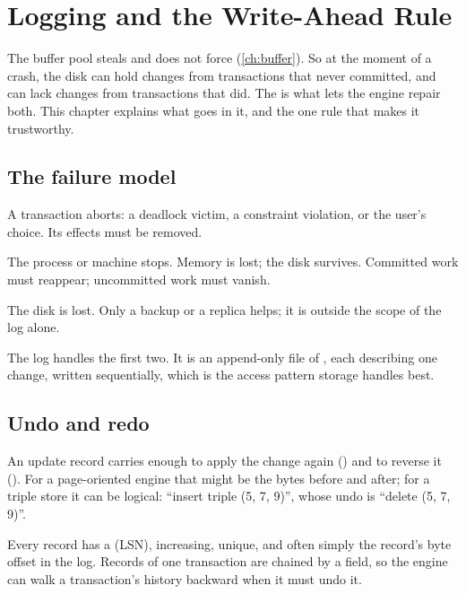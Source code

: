 \chapter{Logging and the Write-Ahead Rule}
\label{ch:wal}

The buffer pool steals and does not force (\cref{ch:buffer}). So at the moment of
a crash, the disk can hold changes from transactions that never committed, and
can lack changes from transactions that did. The  is what lets the
engine repair both. This chapter explains what goes in it, and the one rule that
makes it trustworthy.

\section{The failure model}

\begin{description}[leftmargin=1.2em]
\item[Transaction failure.] A transaction aborts: a deadlock victim, a constraint violation, or the user's choice. Its effects must be removed.
\item[System failure.] The process or machine stops. Memory is lost; the disk survives. Committed work must reappear; uncommitted work must vanish.
\item[Media failure.] The disk is lost. Only a backup or a replica helps; it is outside the scope of the log alone.
\end{description}

The log handles the first two. It is an append-only file of ,
each describing one change, written sequentially, which is the access pattern
storage handles best.

\section{Undo and redo}

An update record carries enough to apply the change again () and to
reverse it (). For a page-oriented engine that might be the bytes
before and after; for a triple store it can be logical: ``insert triple
(5, 7, 9)'', whose undo is ``delete (5, 7, 9)''.

Every record has a  (LSN), increasing, unique, and
often simply the record's byte offset in the log. Records of one transaction are
chained by a  field, so the engine can walk a transaction's history
backward when it must undo it.

